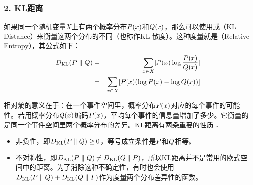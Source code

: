 
\subsubsection{2. KL距离}

\parinterval 如果同一个随机变量$X$上有两个概率分布${P}(x)$和${Q}(x)$，那么可以使用{\small{}}或{\small{}}（KL Distance）来衡量这两个分布的不同（也称作KL 散度）。这种度量就是{\small{}}（Relative Entropy），其公式如下：
\begin{eqnarray}
{D}_{\textrm{KL}}({P}\parallel {Q}) & = & \sum_{x \in X} [ {P}(x)\log \frac{{P}(x) }{ {Q}(x) } ]  \nonumber \\
                                                                                       & = & \sum_{x \in X }[ {P}(x)(\log {P}(x)-\log {Q}(x))]
\label{eq:2-15}
\end{eqnarray}

\parinterval 相对熵的意义在于：在一个事件空间里，概率分布${P}(x)$对应的每个事件的可能性。若用概率分布${Q}(x)$编码${P}(x)$，平均每个事件的信息量增加了多少。它衡量的是同一个事件空间里两个概率分布的差异。KL距离有两条重要的性质：

\begin{itemize}
\vspace{0.5em}
\item 非负性，即${D}_{\textrm{KL}} ({P} \parallel {Q}) \ge 0$，等号成立条件是${P}$和${Q}$相等。
\vspace{0.5em}
\item 不对称性，即${D}_{\textrm{KL}} ({P} \parallel {Q}) \neq {D}_{\textrm{KL}} ({Q}  \parallel {P})$，所以$\textrm{KL}$距离并不是常用的欧式空间中的距离。为了消除这种不确定性，有时也会使用${D}_{\textrm{KL}} ({P}  \parallel {Q})+{D}_{\textrm{KL}} ({Q}  \parallel {P})$作为度量两个分布差异性的函数。
\vspace{0.5em}
\end{itemize}


